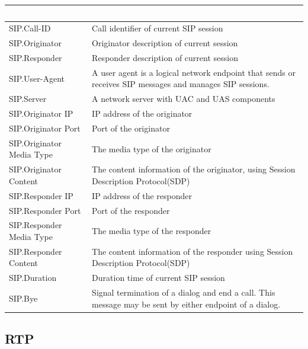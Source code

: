 \begin{longtable}{p{}|p{}}   
    \rowcolor{black}\multicolumn{1}{l!\vlinewhite}{\textcolor{white}{Field}}  & \textcolor{white}{Description} \\\hline
    SIP.Call-ID &	Call identifier of current SIP session \\\hline
    SIP.Originator &	Originator description of current session \\\hline
    SIP.Responder &	Responder description of current session \\\hline
    SIP.User-Agent &	A user agent is a logical network endpoint that sends or receives SIP messages and manages SIP sessions. \\\hline
    SIP.Server &	A network server with UAC and UAS components \\\hline
    SIP.Originator IP &	IP address of the originator \\\hline
    SIP.Originator Port &	Port of the originator \\\hline
    SIP.Originator Media Type &	The media type of the originator \\\hline
    SIP.Originator Content &	The content information of the originator, using Session Description Protocol(SDP) \\\hline
    SIP.Responder IP &	IP address of the responder \\\hline
    SIP.Responder Port &	Port of the responder \\\hline
    SIP.Responder Media Type &	The media type of the responder \\\hline
    SIP.Responder Content &	The content information of the responder using Session Description Protocol(SDP) \\\hline
    SIP.Duration &	Duration time of current SIP session \\\hline
    SIP.Bye &	Signal termination of a dialog and end a call. This message may be sent by either endpoint of a dialog. \\\hline
\end{longtable} 

\subsection*{\hypertarget{link:RTP}{RTP}}
\label{sec:appendix_c:protocol:RTP}

